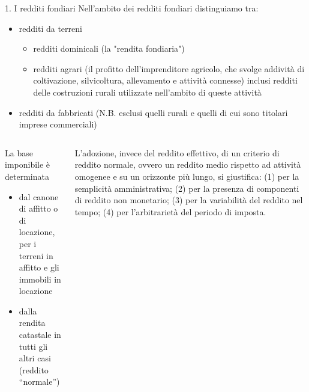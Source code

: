 \documentclass[aspectratio=64,11pt]{beamer}
\newcommand\€{\,\text{€}}
\begin{document}
\begin{frame}{1. I redditi fondiari}
Nell'ambito dei redditi fondiari distinguiamo tra:
\begin{itemize}
\item \alert{redditi da terreni}
\begin{itemize}
\item redditi \alert{dominicali} (la "rendita fondiaria")
\item redditi \alert{agrari} (il profitto dell'imprenditore agricolo, che svolge
addività di coltivazione, silvicoltura, allevamento e attività connesse)
inclusi redditi delle costruzioni rurali utilizzate nell'ambito di queste
attività
\end{itemize}
\item \alert{redditi da fabbricati} (N.B. esclusi quelli rurali e quelli di cui sono titolari
imprese commerciali)
\end{itemize}

\begin{columns}
  \begin{column}{.5\textwidth}
La base imponibile è determinata
\begin{itemize}
\item dal \alert{canone di affitto o di locazione}, per i terreni in affitto e gli immobili
in locazione
\item dalla \alert{rendita catastale} in tutti gli altri casi (reddito ``normale'')
\end{itemize}
\end{column}
\begin{column}{.5\textwidth}
\begin{block}{}
\small
L'adozione, invece del reddito effettivo, di un criterio di \alert{reddito
normale}, ovvero un reddito medio rispetto ad attività omogenee e su un
orizzonte più lungo, si giustifica: (1) per la semplicità amministrativa; (2) per
la presenza di componenti di reddito non monetario; (3) per la variabilità del
reddito nel tempo; (4) per l'arbitrarietà del periodo di imposta.
\end{block}
\end{column}
\end{columns}
\end{frame}
\end{document}
